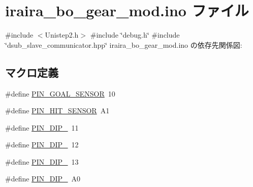 \hypertarget{iraira__bo__gear__mod_8ino}{}\section{iraira\+\_\+bo\+\_\+gear\+\_\+mod.\+ino ファイル}
\label{iraira__bo__gear__mod_8ino}
{\ttfamily \#include $<$Unistep2.\+h$>$}\newline
{\ttfamily \#include \char`\"{}debug.\+h\char`\"{}}\newline
{\ttfamily \#include \char`\"{}dsub\+\_\+slave\+\_\+communicator.\+hpp\char`\"{}}\newline
iraira\+\_\+bo\+\_\+gear\+\_\+mod.\+ino の依存先関係図\+:
\subsection*{マクロ定義}
\begin{DoxyCompactItemize}
\item 
\#define \mbox{\hyperlink{iraira__bo__gear__mod_8ino_a04bd3af8e0d78c7fb2a066085fb8ed19}{P\+I\+N\+\_\+\+G\+O\+A\+L\+\_\+\+S\+E\+N\+S\+OR}}~10
\item 
\#define \mbox{\hyperlink{iraira__bo__gear__mod_8ino_a4d3004c75c745c0b097de0dfea5e52de}{P\+I\+N\+\_\+\+H\+I\+T\+\_\+\+S\+E\+N\+S\+OR}}~A1
\item 
\#define \mbox{\hyperlink{iraira__bo__gear__mod_8ino_a1865ea46eaf057c61c9661e6777e617b}{P\+I\+N\+\_\+\+D\+I\+P\+\_}}~11
\item 
\#define \mbox{\hyperlink{iraira__bo__gear__mod_8ino_aad6f8823636ffe5bee61d57219a18f53}{P\+I\+N\+\_\+\+D\+I\+P\+\_}}~12
\item 
\#define \mbox{\hyperlink{iraira__bo__gear__mod_8ino_af0b38ba5f8b9c96b3a1f03b00382739c}{P\+I\+N\+\_\+\+D\+I\+P\+\_}}~13
\item 
\#define \mbox{\hyperlink{iraira__bo__gear__mod_8ino_a2d393a9dffb71739bd6aa98a0eb94e76}{P\+I\+N\+\_\+\+D\+I\+P\+\_}}~A0
\end{DoxyCompactItemize}
